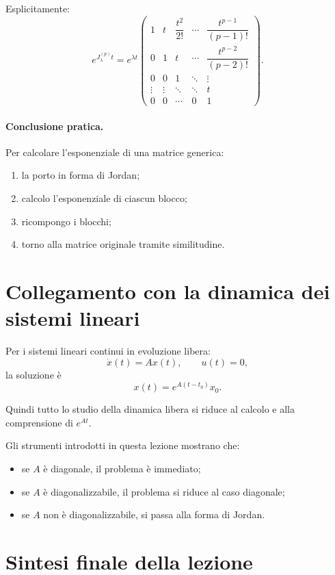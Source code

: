 Esplicitamente:
\begin{equation}
e^{J_\lambda^{(p)}t}
=
e^{\lambda t}
\begin{pmatrix}
1 & t & \dfrac{t^2}{2!} & \cdots & \dfrac{t^{p-1}}{(p-1)!}\\
0 & 1 & t & \cdots & \dfrac{t^{p-2}}{(p-2)!}\\
0 & 0 & 1 & \ddots & \vdots\\
\vdots & \vdots & \ddots & \ddots & t\\
0 & 0 & \cdots & 0 & 1
\end{pmatrix}.
\label{eq:L5_exp_Jordan_block_explicit}
\end{equation}

\paragraph{Conclusione pratica.}
Per calcolare l'esponenziale di una matrice generica:
\begin{enumerate}
    \item la porto in forma di Jordan;
    \item calcolo l'esponenziale di ciascun blocco;
    \item ricompongo i blocchi;
    \item torno alla matrice originale tramite similitudine.
\end{enumerate}

\section{Collegamento con la dinamica dei sistemi lineari}

Per i sistemi lineari continui in evoluzione libera:
\[
\dot x(t)=Ax(t),\qquad u(t)=0,
\]
la soluzione è
\[
x(t)=e^{A(t-t_0)}x_0.
\]

Quindi tutto lo studio della dinamica libera si riduce al calcolo e alla comprensione di $e^{At}$.

Gli strumenti introdotti in questa lezione mostrano che:
\begin{itemize}
    \item se $A$ è diagonale, il problema è immediato;
    \item se $A$ è diagonalizzabile, il problema si riduce al caso diagonale;
    \item se $A$ non è diagonalizzabile, si passa alla forma di Jordan.
\end{itemize}

\section{Sintesi finale della lezione}

